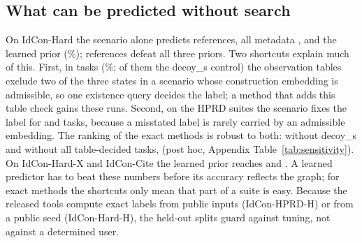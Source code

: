 \subsection{What can be predicted without search}
\label{sec:prior}
On IdCon-Hard the scenario alone predicts \hardPriorScenario{} references, all metadata \hardPriorMeta{}, and the learned prior \hardPriorLearned{} (\hardPriorLearnedPct\%); \priorWrongAllThree{} references defeat all three priors. Two shortcuts explain much of this. First, in \sensDecided{} tasks (\sensDecidedPct\%; \sensDecidedDecoyS{} of them the \textsf{decoy\_s} control) the observation tables exclude two of the three states in a scenario whose construction embedding is admissible, so one existence query decides the label; a method that adds this table check gains these runs. Second, on the HPRD suites the scenario fixes the label for \hprdPriorScenario{} and \hprdxPriorScenario{} tasks, because a misstated label is rarely carried by an admissible embedding. The ranking of the exact methods is robust to both: without \textsf{decoy\_s} and without all \sensDecided{} table-decided tasks, \sensRankSentence{} (post hoc, Appendix Table~\ref{tab:sensitivity}). On IdCon-Hard-X and IdCon-Cite the learned prior reaches \hardxPriorLearned{} and \citePriorLearned{}. A learned predictor has to beat these numbers before its accuracy reflects the graph; for exact methods the shortcuts only mean that part of a suite is easy. Because the released tools compute exact labels from public inputs (IdCon-HPRD-H) or from a public seed (IdCon-Hard-H), the held-out splits guard against tuning, not against a determined user.



